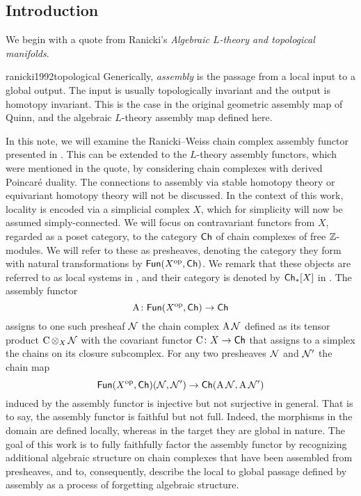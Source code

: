 
\subsection{Introduction}\label{ss:introduction}

We begin with a quote from Ranicki's \textit{Algebraic $L$-theory and topological manifolds}.
\begin{displaycquote}{ranicki1992topological}
	Generically, \textit{assembly} is the passage from a local input to a global output.
	The input is usually topologically invariant and the output is homotopy invariant.
	This is the case in the original geometric assembly map of Quinn, and the algebraic $L$-theory assembly map defined here.
\end{displaycquote}
In this note, we will examine the Ranicki--Weiss chain complex assembly functor presented in \cite{ranicki1990assembly}.
This can be extended to the $L$-theory assembly functors, which were mentioned in the quote, by considering chain complexes with derived Poincaré duality.
The connections to assembly via stable homotopy theory \cite{weiss1995asssembly} or equivariant homotopy theory \cite{davis1998assembly} will not be discussed.
In the context of this work, locality is encoded via a simplicial complex $X$, which for simplicity will now be assumed simply-connected.
We will focus on contravariant functors from $X$, regarded as a poset category, to the category $\mathsf{Ch}$ of chain complexes of free $\mathbb{Z}$-modules.
We will refer to these as presheaves, denoting the category they form with natural transformations by $\mathsf{Fun}(X^{\mathrm{op}}, \mathsf{Ch})$.
We remark that these objects are referred to as local systems in \cite{ranicki1990assembly}, and their category is denoted by $\mathsf{Ch}_\ast[X]$ in \cite[Definition 4.3]{ranicki1992topological}.
The assembly functor
\[
\operatorname{A} \colon \mathsf{Fun}(X^{\mathrm{op}}, \mathsf{Ch}) \to \mathsf{Ch}
\]
assigns to one such presheaf $\mathcal{N}$ the chain complex $\operatorname{A} \mathcal{N}$ defined as its tensor product $\operatorname{C} \operatorname*{\otimes}_X \mathcal{N}$ with the covariant functor $\operatorname{C} \colon X \to \mathsf{Ch}$ that assigns to a simplex the chains on its closure subcomplex.
For any two presheaves $\mathcal{N}$ and $\mathcal{N}'$ the chain map
\[
\mathsf{Fun}(X^{\mathrm{op}},\mathsf{Ch})(\mathcal{N},\mathcal{N}') \to \mathsf{Ch}(\operatorname{A} \mathcal{N}, \operatorname{A} \mathcal{N}')
\]
induced by the assembly functor is injective but not surjective in general.
That is to say, the assembly functor is faithful but not full.
Indeed, the morphisms in the domain are defined locally, whereas in the target they are global in nature.
The goal of this work is to fully faithfully factor the assembly functor by recognizing additional algebraic structure on chain complexes that have been assembled from presheaves, and to, consequently, describe the local to global passage defined by assembly as a process of forgetting algebraic structure.
